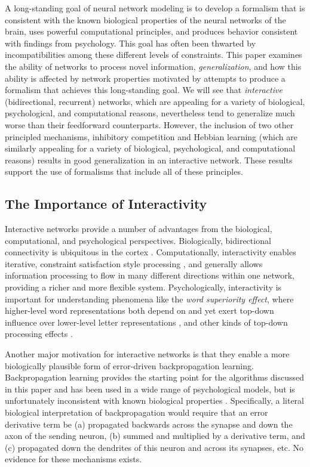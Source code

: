 \documentclass[12pt,twoside]{article}
\begin{document}
A long-standing goal of neural network modeling is to develop a
formalism that is consistent with the known biological properties of
the neural networks of the brain, uses powerful computational
principles, and produces behavior consistent with findings from
psychology.  This goal has often been thwarted by incompatibilities
among these different levels of constraints.  This paper examines the
ability of networks to process novel information, {\em
  generalization}, and how this ability is affected by network
properties motivated by attempts to produce a formalism that achieves
this long-standing goal.  We will see that {\em interactive}
(bidirectional, recurrent) networks, which are appealing for a variety
of biological, psychological, and computational reasons, nevertheless
tend to generalize much worse than their feedforward counterparts.
However, the inclusion of two other principled mechanisms, inhibitory
competition and Hebbian learning (which are similarly appealing for a
variety of biological, psychological, and computational reasons)
results in good generalization in an interactive network.  These
results support the use of formalisms that include all of these
principles.

\subsection{The Importance of Interactivity}

Interactive networks provide a number of advantages from the
biological, computational, and psychological perspectives.
Biologically, bidirectional connectivity is ubiquitous in the cortex
\cite[e.g.,]{FellemanVanEssen91,LevittLewisYoshiokaLund93,WhiteEl89,DouglasMartin90}.
Computationally, interactivity enables iterative, constraint
satisfaction style processing
\cite{Smolensky86,AckleyHintonSejnowski85,Hopfield82,Hopfield84}, and
generally allows information processing to flow in many different
directions within one network, providing a richer and more flexible
system.  Psychologically, interactivity is important for understanding
phenomena like the {\em word superiority effect}, where higher-level
word representations both depend on and yet exert top-down influence
over lower-level letter representations \cite{McClellandRumelhart81},
and other kinds of top-down processing effects
\cite[e.g.,]{VeceraOReilly98}.

Another major motivation for interactive networks is that they enable
a more biologically plausible form of error-driven backpropagation
learning.  Backpropagation learning \cite{RumelhartHintonWilliams86}
provides the starting point for the algorithms discussed in this paper
and has been used in a wide range of psychological models, but is
unfortunately inconsistent with known biological properties
\cite{Crick89,ZipserAndersen88}.  Specifically, a literal biological
interpretation of backpropagation would require that an error
derivative term be (a) propagated backwards across the synapse and
down the axon of the sending neuron, (b) summed and multiplied by a
derivative term, and (c) propagated down the dendrites of this neuron
and across its synapses, etc.  No evidence for these mechanisms
exists.
\end{document}
